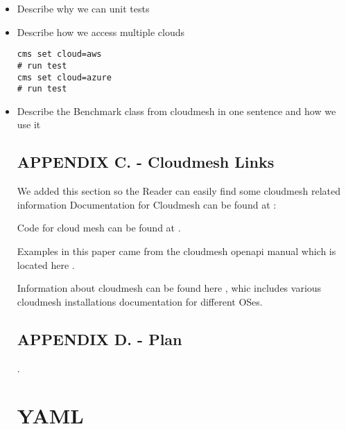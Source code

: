 \begin{itemize}
\item
  Describe why we can unit tests
\item
  Describe how we access multiple clouds

\begin{verbatim}
cms set cloud=aws
# run test
cms set cloud=azure
# run test
\end{verbatim}
\item
  Describe the Benchmark class from cloudmesh in one sentence and how we
  use it

\subsection{APPENDIX C. - Cloudmesh
Links}\label{appendix-c.---cloudmesh-links}

We added this section so the Reader can easily find some cloudmesh
related information Documentation for Cloudmesh can be found at \cite{cloudmesh-manual}:

Code for cloud mesh can be found at \cite{cloudmesh-github}.

Examples in this paper came from the cloudmesh openapi manual which is
located here \cite{cloudmesh-openapi}.

Information about cloudmesh can be found here \cite{cloudmesh-manual},
whic includes various cloudmesh installations documentation for
different OSes.

\subsection{APPENDIX D. - Plan}\label{appendix-d.---plan}

\cite{www-skikit-learn-faces}.

\section{YAML}




\end{itemize}
